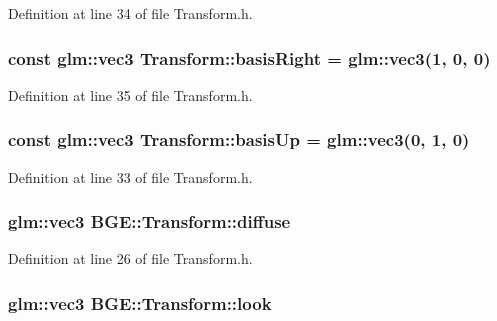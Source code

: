 Definition at line 34 of file Transform.\-h.

\hypertarget{class_b_g_e_1_1_transform_ab1f6463365cef7fdba189e99b519b7a5}{
\subsubsection[{basis\-Right}]{\setlength{\rightskip}{0pt plus 5cm}const glm\-::vec3 Transform\-::basis\-Right = glm\-::vec3(1, 0, 0)\hspace{0.3cm}{\ttfamily [static]}}}\label{class_b_g_e_1_1_transform_ab1f6463365cef7fdba189e99b519b7a5}


Definition at line 35 of file Transform.\-h.

\hypertarget{class_b_g_e_1_1_transform_a4138712e358f3407c2e581a577bba923}{
\subsubsection[{basis\-Up}]{\setlength{\rightskip}{0pt plus 5cm}const glm\-::vec3 Transform\-::basis\-Up = glm\-::vec3(0, 1, 0)\hspace{0.3cm}{\ttfamily [static]}}}\label{class_b_g_e_1_1_transform_a4138712e358f3407c2e581a577bba923}


Definition at line 33 of file Transform.\-h.

\hypertarget{class_b_g_e_1_1_transform_ae7028b3d27235e33ae62f36256e0d8ff}{
\subsubsection[{diffuse}]{\setlength{\rightskip}{0pt plus 5cm}glm\-::vec3 B\-G\-E\-::\-Transform\-::diffuse}}\label{class_b_g_e_1_1_transform_ae7028b3d27235e33ae62f36256e0d8ff}


Definition at line 26 of file Transform.\-h.

\hypertarget{class_b_g_e_1_1_transform_a26a45bbb5d264d4a6c1dce74c25e4b01}{
\subsubsection[{look}]{\setlength{\rightskip}{0pt plus 5cm}glm\-::vec3 B\-G\-E\-::\-Transform\-::look}}\label{class_b_g_e_1_1_transform_a26a45bbb5d264d4a6c1dce74c25e4b01}


